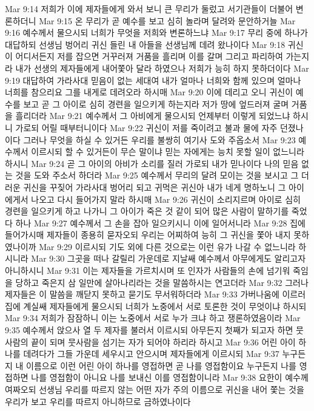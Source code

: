 Mar 9:14  저희가 이에 제자들에게 와서 보니 큰 무리가 둘렀고 서기관들이 더불어 변론하더니
Mar 9:15  온 무리가 곧 예수를 보고 심히 놀라며 달려와 문안하거늘
Mar 9:16  예수께서 물으시되 너희가 무엇을 저희와 변론하느냐
Mar 9:17  무리 중에 하나가 대답하되 선생님 벙어리 귀신 들린 내 아들을 선생님께 데려 왔나이다
Mar 9:18  귀신이 어디서든지 저를 잡으면 거꾸러져 거품을 흘리며 이를 갈며 그리고 파리하여 가는지라 내가 선생의 제자들에게 내어쫓아 달라 하였으나 저희가 능히 하지 못하더이다
Mar 9:19  대답하여 가라사대 믿음이 없는 세대여 내가 얼마나 너희와 함께 있으며 얼마나 너희를 참으리요 그를 내게로 데려오라 하시매
Mar 9:20  이에 데리고 오니 귀신이 예수를 보고 곧 그 아이로 심히 경련을 일으키게 하는지라 저가 땅에 엎드러져 굴며 거품을 흘리더라
Mar 9:21  예수께서 그 아비에게 물으시되 언제부터 이렇게 되었느냐 하시니 가로되 어릴 때부터니이다
Mar 9:22  귀신이 저를 죽이려고 불과 물에 자주 던졌나이다 그러나 무엇을 하실 수 있거든 우리를 불쌍히 여기사 도와 주옵소서
Mar 9:23  예수께서 이르시되 할 수 있거든이 무슨 말이냐 믿는 자에게는 능치 못할 일이 없느니라 하시니
Mar 9:24  곧 그 아이의 아비가 소리를 질러 가로되 내가 믿나이다 나의 믿음 없는 것을 도와 주소서 하더라
Mar 9:25  예수께서 무리의 달려 모이는 것을 보시고 그 더러운 귀신을 꾸짖어 가라사대 벙어리 되고 귀먹은 귀신아 내가 네게 명하노니 그 아이에게서 나오고 다시 들어가지 말라 하시매
Mar 9:26  귀신이 소리지르며 아이로 심히 경련을 일으키게 하고 나가니 그 아이가 죽은 것 같이 되어 많은 사람이 말하기를 죽었다 하나
Mar 9:27  예수께서 그 손을 잡아 일으키시니 이에 일어서니라
Mar 9:28  집에 들어가시매 제자들이 종용히 묻자오되 우리는 어찌하여 능히 그 귀신을 쫓아 내지 못하였나이까
Mar 9:29  이르시되 기도 외에 다른 것으로는 이런 유가 나갈 수 없느니라 하시니라
Mar 9:30  그곳을 떠나 갈릴리 가운데로 지날쌔 예수께서 아무에게도 알리고자 아니하시니
Mar 9:31  이는 제자들을 가르치시며 또 인자가 사람들의 손에 넘기워 죽임을 당하고 죽은지 삼 일만에 살아나리라는 것을 말씀하시는 연고더라
Mar 9:32  그러나 제자들은 이 말씀을 깨닫지 못하고 묻기도 무서워하더라
Mar 9:33  가버나움에 이르러 집에 계실쌔 제자들에게 물으시되 너희가 노중에서 서로 토론한 것이 무엇이냐 하시되
Mar 9:34  저희가 잠잠하니 이는 노중에서 서로 누가 크냐 하고 쟁론하였음이라
Mar 9:35  예수께서 앉으사 열 두 제자를 불러서 이르시되 아무든지 첫째가 되고자 하면 뭇사람의 끝이 되며 뭇사람을 섬기는 자가 되어야 하리라 하시고
Mar 9:36  어린 아이 하나를 데려다가 그들 가운데 세우시고 안으시며 제자들에게 이르시되
Mar 9:37  누구든지 내 이름으로 이런 어린 아이 하나를 영접하면 곧 나를 영접함이요 누구든지 나를 영접하면 나를 영접함이 아니요 나를 보내신 이를 영접함이니라
Mar 9:38  요한이 예수께 여짜오되 선생님 우리를 따르지 않는 어떤 자가 주의 이름으로 귀신을 내어 쫓는 것을 우리가 보고 우리를 따르지 아니하므로 금하였나이다
